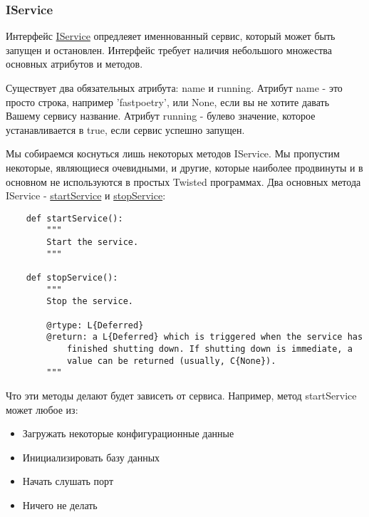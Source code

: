 \subsubsection{IService}


Интерфейс 
\href{http://twistedmatrix.com/trac/browser/tags/releases/twisted-10.0.0/twisted/application/service.py#L87}{IService} опредлеяет именнованный сервис, 
который может быть запущен и остановлен. 
Интерфейс требует наличия небольшого 
множества основных атрибутов и методов.


Существует два обязательных атрибута: name и running. 
Атрибут name - это просто строка, например 'fastpoetry', или 
None, если вы не хотите давать Вашему сервису название. 
Атрибут running - булево значение, которое устанавливается в true, 
если сервис успешно запущен.


Мы собираемся коснуться лишь некоторых методов IService. 
Мы пропустим некоторые, являющиеся очевидными, и другие, которые 
наиболее продвинуты и в основном не используются в простых 
Twisted программах. Два основных метода IService - 
\href{http://twistedmatrix.com/trac/browser/tags/releases/twisted-10.0.0/twisted/application/service.py#L130}{startService} и 
\href{http://twistedmatrix.com/trac/browser/tags/releases/twisted-10.0.0/twisted/application/service.py#L135}{stopService}:

 \begin{verbatim}
    def startService():
        """
        Start the service.
        """

    def stopService():
        """
        Stop the service.

        @rtype: L{Deferred}
        @return: a L{Deferred} which is triggered when the service has
            finished shutting down. If shutting down is immediate, a
            value can be returned (usually, C{None}).
        """

\end{verbatim} 

Что эти методы делают будет зависеть от сервиса. Например, 
метод startService может любое из:

\begin{itemize}
\item Загружать некоторые конфигурационные данные
\item Инициализировать базу данных
\item Начать слушать порт
\item Ничего не делать 
\end{itemize}



